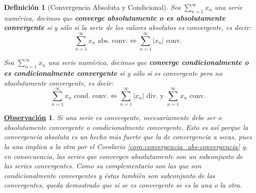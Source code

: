 \documentclass[10pt,a4paper,openright]{book}
\theoremstyle{break}
\newtheorem{defi}{Definición}[chapter]
\newtheorem{obs}{\underline{Observación}}[chapter]
\begin{document}
\begin{defi}[Convergencia Absoluta y Condicional]
Sea $\sum_{n = 1}^{\infty} x_n$ una serie numérica, decimos que \textbf{converge absolutamente o es absolutamente convergente} si y sólo si la serie de los valores absolutos es convergente, es decir:
\[
\sum_{n = 1}^{\infty} x_n\mbox{ abs. conv.} \Leftrightarrow \sum_{n=1}^{\infty} |x_n|\mbox{ conv.}
\]

Sea $\sum_{n = 1}^{\infty} x_n$ una serie numérica, decimos que \textbf{converge condicionalmente o es condicionalmente convergente} si y sólo si es convergente pero no absolutamente convergente, es decir:
\[
\sum_{n = 1}^{\infty} x_n\mbox{ cond. conv.} \Leftrightarrow \sum_{n=1}^{\infty} |x_n|\mbox{ div. y } \sum_{n = 1}^{\infty} x_n \mbox{ conv.}
\]
\end{defi}

\begin{obs}
Si una serie es convergente, necesariamente debe ser o absolutamente convergente o condicionalmente convergente. Esto es así porque la convergencia absoluta es un hecho más fuerte que la de convergencia a secas, pues la una implica a la otra por el Corolario \ref{coro:convergencia_abs-convergencia} y, en consecuencia, las series que convergen absolutamente son un subconjunto de las series convergentes. Como su complementario son las que son condicionalmente convergentes y éstas también son subconjunto de las convergentes, queda demostrado que si se es convergente se es la una o la otra.
\end{obs}
\end{document}
